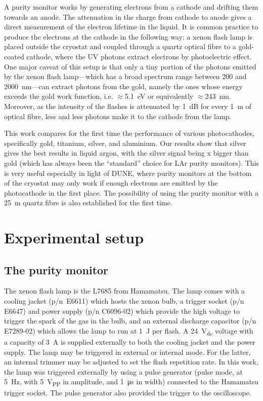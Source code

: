 \documentclass[a4paper,11pt]{article}
\begin{document}
A purity monitor works by generating electrons from a cathode and drifting them towards an anode. The attenuation in the charge from cathode to anode gives a direct measurement of the electron lifetime in the liquid. 
It is common practice to produce the electrons at the cathode in the following way: a xenon flash lamp is placed outside the cryostat and coupled through a quartz optical fibre to a gold-coated cathode, where the UV photons extract electrons by photoelectric effect.
One major caveat of this setup is that only a tiny portion of the photons emitted by the xenon flash lamp---which has a broad spectrum range between 200 and \SI{2000}{nm}---can extract photons from the gold, namely the ones whose energy exceeds the gold work function, i.e. $\approx$\SI{5.1}{\eV} or equivalently $\approx$\SI{243}{nm}. Moreover, as the intensity of the flashes is attenuated by \SI{1}{\dB} for every \SI{1}{m} of optical fibre, less and less photons make it to the cathode from the lamp. 

This work compares for the first time the performance of various photocathodes, specifically gold, titanium, silver, and aluminium. Our results show that silver gives the best results in liquid argon, with the silver signal being x bigger than gold (which has always been the ``standard'' choice for LAr purity monitors). This is very useful especially in light of DUNE, where purity monitors at the bottom of the cryostat may only work if enough electrons are emitted by the photocathode in the first place. 
The possibility of using the purity monitor with a \SI{25}{m} quartz fibre is also established for the first time.  

\section{Experimental setup}
\subsection{The purity monitor}
The xenon flash lamp is the L7685 from Hamamatsu. The lamp comes with a cooling jacket (p/n~E6611) which hosts the xenon bulb, a trigger socket (p/n E6647) and power supply (p/n C6096-02) which provide the high voltage to trigger the spark of the gas in the bulb, and an external discharge capacitor (p/n E7289-02) which allows the lamp to run at \SI{1}{\joule} per flash. A \SI{24}{V_{dc}} voltage with a capacity of \SI{3}{A} is supplied externally to both the cooling jacket and the power supply. The lamp may be triggered in external or internal mode. For the latter, an internal trimmer may be adjusted to set the flash repetition rate. In this work, the lamp was triggered externally by using a pulse generator (pulse mode, at \SI{5}{Hz}, with \SI{5}{V_{PP}} in amplitude, and \SI{1}{\micro s} in width) connected to the Hamamatsu trigger socket. The pulse generator also provided the trigger to the oscilloscope. 
\end{document}
